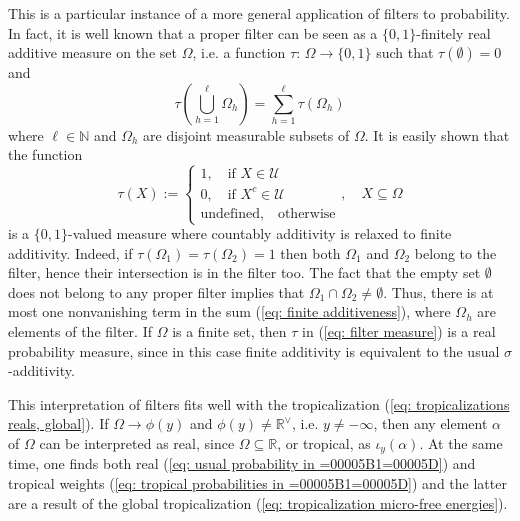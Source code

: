 \documentclass[11pt,british,reqno]{article}
\numberwithin{equation}{section}
\numberwithin{figure}{section}
\numberwithin{table}{section}
\theoremstyle{definition}
\theoremstyle{definition}
\theoremstyle{plain}
\theoremstyle{plain}
\theoremstyle{remark}
\theoremstyle{plain}
\numberwithin{equation}{section}
\numberwithin{figure}{section}
\numberwithin{table}{section}
\theoremstyle{plain}
\begin{document}
This is a particular instance of a more general application of filters
to probability. In fact, it is well known that a proper filter can
be seen as a $\{0,1\}$-finitely real additive measure on the set
$\Omega$, i.e. a function $\tau:\,\Omega\longrightarrow\{0,1\}$
such that $\tau(\emptyset)=0$ and 
\begin{equation}
{\displaystyle \tau\left(\bigcup_{h=1}^{\ell}\Omega_{h}\right)=\sum_{h=1}^{\ell}\tau(\Omega_{h})}\label{eq: finite additiveness}
\end{equation}
where $\ell\in\mathbb{N}$ and $\Omega_{h}$ are disjoint measurable
subsets of $\Omega$. It is easily shown that the function 
\begin{equation}
\tau(X):=\left\{ \begin{array}{c}
1,\quad\mbox{if }X\in\mathcal{U}\\
0,\quad\mbox{if }X^{c}\in\mathcal{U}\\
\mbox{undefined},\quad\mbox{otherwise}
\end{array}\right.,\quad X\subseteq\Omega\label{eq: filter measure}
\end{equation}
is a $\{0,1\}$-valued measure where countably additivity is relaxed
to finite additivity. Indeed, if $\tau(\Omega_{1})=\tau(\Omega_{2})=1$
then both $\Omega_{1}$ and $\Omega_{2}$ belong to the filter, hence
their intersection is in the filter too. The fact that the empty set
$\emptyset$ does not belong to any proper filter implies that $\Omega_{1}\cap\Omega_{2}\neq\emptyset$.
Thus, there is at most one nonvanishing term in the sum (\ref{eq: finite additiveness}),
where $\Omega_{h}$ are elements of the filter. If $\Omega$ is a
finite set, then $\tau$ in (\ref{eq: filter measure}) is a real
probability measure, since in this case finite additivity is equivalent
to the usual $\sigma$-additivity. 

This interpretation of filters fits well with the tropicalization
(\ref{eq: tropicalizations reals, global}). If $\Omega\longrightarrow\phi(y)$
and $\phi(y)\neq\mathbb{R}^{\vee}$, i.e. $y\neq-\infty$, then any
element $\alpha$ of $\Omega$ can be interpreted as real, since $\Omega\subseteq\mathbb{R}$,
or tropical, as $\iota_{y}(\alpha)$. At the same time, one finds
both real (\ref{eq: usual probability in =00005B1=00005D}) and tropical
weights (\ref{eq: tropical probabilities in =00005B1=00005D}) and
the latter are a result of the global tropicalization (\ref{eq: tropicalization micro-free energies}). 
\end{document}
